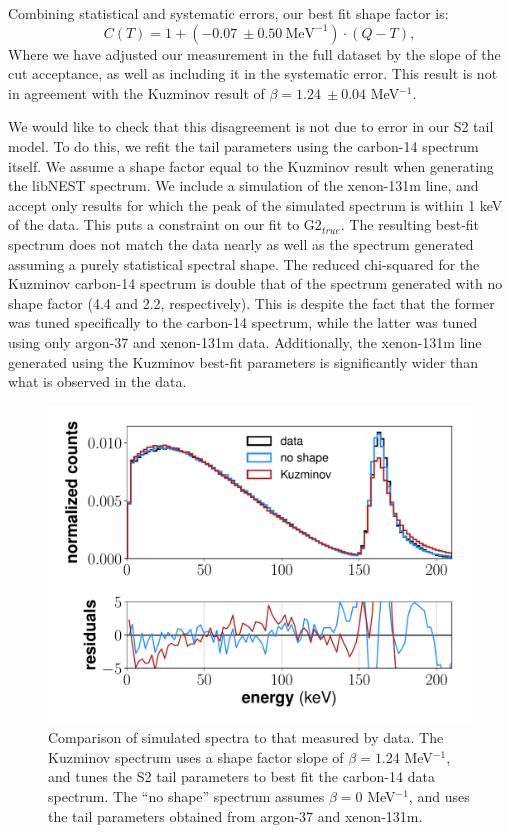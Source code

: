 Combining statistical and systematic errors, our best fit shape factor is:
\begin{equation}
C(T)=1+(-0.07 \ \pm0.50 \ \text{MeV}^{-1})\cdot(Q-T),
\end{equation}
Where we have adjusted our measurement in the full dataset by the slope of the cut acceptance, as well as including it in the systematic error. This result is not in agreement with the Kuzminov result of $\beta=1.24 \ \pm0.04$ MeV$^{-1}$. 

We would like to check that this disagreement is not due to error in our S2 tail model. To do this, we refit the tail parameters using the carbon-14 spectrum itself. We assume a shape factor equal to the Kuzminov result when generating the libNEST spectrum. We include a simulation of the xenon-131m line, and accept only results for which the peak of the simulated spectrum is within 1 keV of the data. This puts a constraint on our fit to G2$_{true}$. The resulting best-fit spectrum does not match the data nearly as well as the spectrum generated assuming a purely statistical spectral shape. The reduced chi-squared for the Kuzminov carbon-14 spectrum is double that of the  spectrum generated with no shape factor (4.4 and 2.2, respectively). This is despite the fact that the former was tuned specifically to the carbon-14 spectrum, while the latter was tuned using only argon-37 and xenon-131m data. Additionally, the xenon-131m line generated using the Kuzminov best-fit parameters is significantly wider than what is observed in the data.
\begin{figure}[!h]
\centering
  \includegraphics[width=\textwidth]{Figures/C14_spectrum_shapecomp.pdf}
\caption{Comparison of simulated spectra to that measured by data. The Kuzminov spectrum uses a shape factor slope of $\beta=1.24$ MeV$^{-1}$, and tunes the S2 tail parameters to best fit the carbon-14 data spectrum. The ``no shape'' spectrum assumes $\beta=0$ MeV$^{-1}$, and uses the tail parameters obtained from argon-37 and xenon-131m.}
\label{fig:C14_shape}
\end{figure}


